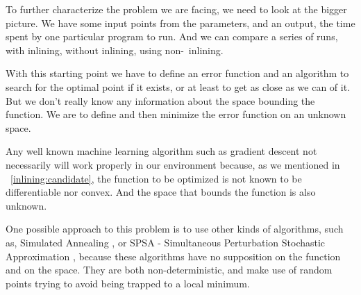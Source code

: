 

To further characterize the problem we are facing, we need to look at
the bigger picture. We have some input points from the parameters, and
an output, the time spent by one particular program to run. And we can
compare a series of runs, with inlining, without inlining, using non-\FDO\
inlining.

With this starting point we have to define an error function and an algorithm
to search for the optimal point if it exists, or at least to get as close as
we can of it. But we don't really know any information about the space bounding
the function. We are to define and then minimize the error function on an
unknown space.

Any well known machine learning algorithm such as gradient descent
not necessarily will work properly in our environment because, as
we mentioned in ~\ref{inlining:candidate}, the function to be optimized
is not known to be differentiable nor convex. And the space that bounds
the function is also unknown.

One possible approach to this problem is to use other kinds of algorithms,
such as, Simulated Annealing \cite{Zhong2009}, or SPSA - Simultaneous Perturbation Stochastic
Approximation \cite{Spall1999,Spall2012}, because these algorithms have no
supposition on the function and on the space. They are both non-deterministic,
and make use of random points trying to avoid being trapped to a local minimum.

